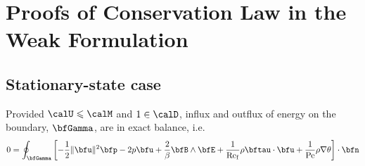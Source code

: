 \chapter{Proofs of Conservation Law in the Weak Formulation}\label{cha:weak conservation proofs}
    \section*{Stationary-state case}
        \begin{theorem*}
            Provided $\calU  \leqslant  \calM$ and $1  \in  \calD$, influx and outflux  of energy on the boundary, $\bfGamma$, are in exact balance, i.e.
            \begin{equation}
                0  =  \oint_{\bfGamma}\left[- \frac{1}{2}\|\bfu\|^{2}\bfp - 2p\bfu + \frac{2}{\beta}\bfB\wedge\bfE + \frac{1}{\rmRef}\rho\bftau\cdot\bfu + \frac{1}{\rmPe}\rho\nabla\theta\right]\cdot\bfn
            \end{equation}
        \end{theorem*}

